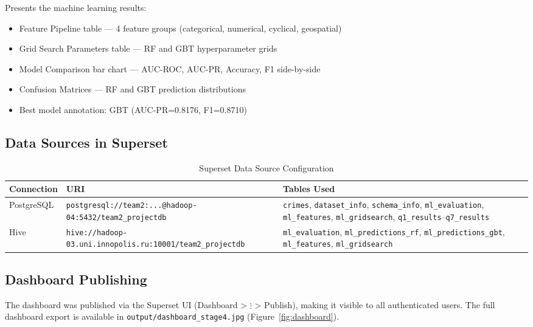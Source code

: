 Presents the machine learning results:

\begin{itemize}
    \item Feature Pipeline table — 4 feature groups (categorical, numerical, cyclical, geospatial)
    \item Grid Search Parameters table — RF and GBT hyperparameter grids
    \item Model Comparison bar chart — AUC-ROC, AUC-PR, Accuracy, F1 side-by-side
    \item Confusion Matrices — RF and GBT prediction distributions
    \item Best model annotation: GBT (AUC-PR=0.8176, F1=0.8710)
\end{itemize}

\subsection{Data Sources in Superset}

\begin{table}[H]
\centering
\caption{Superset Data Source Configuration}
\label{tab:superset-sources}
\begin{tabularx}{\textwidth}{llX}
\toprule
\textbf{Connection} & \textbf{URI} & \textbf{Tables Used} \\
\midrule
PostgreSQL & \texttt{postgresql://team2:...@hadoop-04:5432/team2\_projectdb} & \texttt{crimes}, \texttt{dataset\_info}, \texttt{schema\_info}, \texttt{ml\_evaluation}, \texttt{ml\_features}, \texttt{ml\_gridsearch}, \texttt{q1\_results}--\texttt{q7\_results} \\
Hive & \texttt{hive://hadoop-03.uni.innopolis.ru:10001/team2\_projectdb} & \texttt{ml\_evaluation}, \texttt{ml\_predictions\_rf}, \texttt{ml\_predictions\_gbt}, \texttt{ml\_features}, \texttt{ml\_gridsearch} \\
\bottomrule
\end{tabularx}
\end{table}

\subsection{Dashboard Publishing}

The dashboard was published via the Superset UI (Dashboard > $\vdots$ > Publish), making it visible to all authenticated users. The full dashboard export is available in \texttt{output/dashboard\_stage4.jpg} (Figure~\ref{fig:dashboard}).

